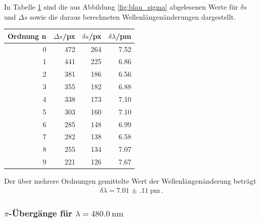 \documentclass[captions=tableheading]{scrartcl}
\begin{document}
In Tabelle \ref{tab:blausigmamessung} sind die aus Abbildung \ref{fig:blau_sigma} abgelesenen Werte für $\delta s$ und $\Delta s$ sowie die daraus berechneten Wellenlängenänderungen dargestellt.
\begin{table}[H]
	\centering
	\label{tab:blausigmamessung}
	\begin{tabular}{r r r r}
			\toprule
			Ordnung n & $\Delta s$/px & $\delta s$/px & $\delta \lambda$/pm \\
			\midrule
			0 & 472 & 264 & 7.52 \\
			1 & 441 & 225 & 6.86 \\
			2 & 381 & 186 & 6.56 \\
			3 & 355 & 182 & 6.88 \\
			4 & 338 & 173 & 7.10 \\
			5 & 303 & 160 & 7.10 \\
			6 & 285 & 148 & 6.99\\
			7 & 282 & 138 & 6.58 \\
			8 & 255 & 134 & 7.07\\
			9 & 221 & 126 & 7.67 \\
			\bottomrule
	\end{tabular}
\end{table}
Der über mehrere Ordnungen gemittelte Wert der Wellenlängenänderung beträgt
\begin{align}
\delta \lambda = \SI{7.01(11)}{\pico\metre}\,.
\end{align}
\subsubsection{$\pi$-Übergänge für $\lambda=\SI{480.0}{\nano\metre}$}
\end{document}
